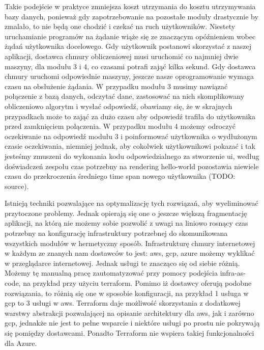 Takie podejście w praktyce zmniejsza koszt utrzymania do kosztu utrzymywania bazy danych, ponieważ gdy zapotrzebowanie na pozostałe moduły drastycznie by zmalało, to nie będą one chodzić i czekać na ruch użytkowników.
Niestety uruchamianie programów na żądanie wiąże się ze znaczącym opóźnieniem wobec żądań użytkownika docelowego.
Gdy użytkownik postanowi skorzystać z naszej aplikacji, dostawca chmury obliczeniowej musi uruchomić co najmniej dwie maszyny, dla modułu 3 i 4, co czasami potrafi zająć kilka sekund.
Gdy dostawca chmury uruchomi odpowiednie maszyny, jeszcze nasze oprogramowanie wymaga czasu na obsłużenie żądania.
W przypadku modułu 3 musimy nawiązać połączenie z bazą danych, odczytać dane, zastosować na nich skomplikowany obliczeniowo algorytm i wysłać odpowiedź, obawiamy się, że w skrajnych przypadkach może to zająć za dużo czasu aby odpowiedź trafiła do użytkownika przed zamknięciem połączenia.
W przypadku modułu 4 możemy odroczyć oczekiwanie na odpowiedź modułu 3 i poinformować użytkownika o wydłużonym czasie oczekiwania, niemniej jednak, aby cokolwiek użytkownikowi pokazać i tak jesteśmy zmuszeni do wykonania kodu odpowiedzialnego za stworzenie \gls{ui}, według doświadczeń zespołu czas potrzebny na \gls{rendering} \gls{hello-world} pozostawia niewiele czasu do przekroczenia średniego time span nowego użytkownika (TODO: source).

Istnieją techniki pozwalające na optymalizację tych rozwiązań, aby wyeliminować przytoczone problemy.
Jednak opierają się one o jeszcze większą fragmentację aplikacji, na którą nie możemy sobie pozwolić z uwagi na liniowo rosnący czas potrzebny na konfigurację infrastruktury potrzebnej do skomunikowana wszystkich modułów w \gls{hermetyczny} sposób.
Infrastrukturę chmury internetowej w każdym ze znanych nam dostawców to jest: \acrshort{aws}, \acrshort{gcp}, \acrshort{azure} możemy wyklikać w przeglądarce internetowej.
Jednak usługi te znacząco się od siebie różnią.
Możemy tę manualną pracę zautomatyzować przy pomocy podejścia \gls{infra-as-code}, na przykład przy użyciu terraform.
Pomimo iż dostawcy oferują podobne rozwiązania, to różnią się one w sposobie konfiguracji, na przykład 1 usługa w \acrshort{gcp} to 3 usługi w \acrshort{aws}\@.
Terraform daje możliwość skorzystania z dodatkowej warstwy abstrakcji pozwalającej na opisanie architektury dla \acrshort{aws}, jak i zarówno \acrshort{gcp}, jednakże nie jest to pełne wsparcie i niektóre usługi po prostu nie pokrywają się pomiędzy dostawcami.
Ponadto Terraform nie wspiera takiej funkcjonalności dla Azure.

